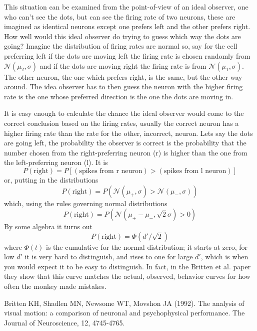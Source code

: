\documentclass[11pt,a4paper]{scrartcl}
\begin{document}
This situation can be examined from the point-of-view of an ideal
observer, one who can't see the dots, but can see the firing rate of
two neurons, these are imagined as identical neurons except one
prefers left and the other prefers right. How well would this ideal
observer do trying to guess which way the dots are going? Imagine the
distribution of firing rates are normal so, say for the cell
preferring left if the dots are moving left the firing rate is chosen
randomly from $\mathcal{N}(\mu_2,\sigma)$ and if the dots are moving
right the firing rate is from $\mathcal{N}(\mu_1,\sigma)$. The other
neuron, the one which prefers right, is the same, but the other way
around. The idea observer has to then guess the neuron with the higher
firing rate is the one whose preferred direction is the one the dots
are moving in.

It is easy enough to calculate the chance the ideal observer would
come to the correct conclusion based on the firing rates, usually the
correct neuron has a higher firing rate than the rate for the other,
incorrect, neuron. Lets say the dots are going left, the probability
the observer is correct is the probability that the number chosen from
the right-preferring neuron (r) is higher than the one from the left-preferring
neuron (l). It is
\begin{equation}
P(\mbox{right})=P[(\mbox{spikes from r neuron})>(\mbox{spikes from l neuron})]
\end{equation}
or, putting in the distributions
\begin{equation}
P(\mbox{right})=P(\mathcal{N}(\mu_+,\sigma)>\mathcal{N}(\mu_-,\sigma))
\end{equation}
which, using the rules governing normal distributions
\begin{equation}
P(\mbox{right})=P(\mathcal{N}(\mu_+-\mu_-,\sqrt{2}\sigma)>0)
\end{equation}
By some algebra it turns out
\begin{equation}
P(\mbox{right})=\Phi(d'/\sqrt{2})
\end{equation}
where $\Phi(t)$ is the cumulative for the normal distribution; it
starts at zero, for low $d'$ it is very hard to distinguish, and rises
to one for large $d'$, which is when you would expect it to be easy to
distinguish. In fact, in the Britten et al. paper
\cite{BrittenEtAl1992} they show that this curve matches the actual,
observed, behavior curves for how often the monkey made mistakes.

\begin{thebibliography}{10}

Britten KH, Shadlen MN, Newsome WT, Movshon JA (1992). The analysis of visual motion: a comparison of neuronal and psychophysical performance. 
\newblock The Journal of Neuroscience, 12, 4745-4765.

\end{thebibliography}
\end{document}
